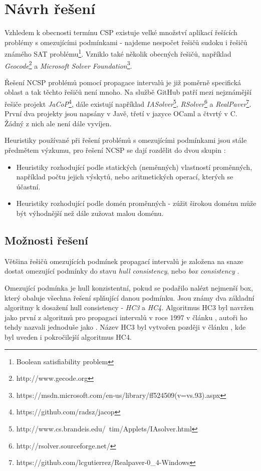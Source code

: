 \chapter{Návrh řešení}

Vzhledem k obecnosti termínu CSP existuje velké množství aplikací řešících problémy s omezujícími podmínkami - najdeme nespočet řešičů sudoku i řešičů známého SAT problému\footnote{Boolean satisfiability problem}. Vzniklo také několik obecných řešičů, například \emph{Geocode}\footnote{http://www.gecode.org} a \emph{Microsoft Solver Foundation}\footnote{https://msdn.microsoft.com/en-us/library/ff524509(v=vs.93).aspx}.

Řešení NCSP problémů pomocí propagace intervalů je již poměrně specifická oblast a tak těchto řešičů není mnoho. Na službě GitHub patří mezi nejznámější řešiče projekt \emph{JaCoP}\footnote{https://github.com/radsz/jacop}, dále existují například \emph{IASolver}\footnote{http://www.cs.brandeis.edu/~tim/Applets/IAsolver.html}, \emph{RSolver}\footnote{http://rsolver.sourceforge.net/} a \emph{RealPaver}\footnote{https://github.com/lcgutierrez/Realpaver-0\_4-Windows}. První dva projekty jsou napsány v Javě, třetí v jazyce OCaml a čtvrtý v C. Žádný z nich ale není dále vyvíjen.

Heuristiky používané při řešení problémů s omezujícími podmínkami jsou stále předmětem výzkumu, pro řešení NCSP se dají rozdělit do dvou skupin \cite{feiten10}:

\begin{itemize}
  \item Heuristiky rozhodující podle statických (neměnných) vlastností proměnných, například počtu jejich výskytů, nebo aritmetických operací, kterých se účastní.
  \item Heuristiky rozhodující podle domén proměnných - zúžit širokou doménu může být výhodnější než dále zužovat malou doménu.
\end{itemize}

\section{Možnosti řešení}
Většina řešičů omezujících podmínek propagací intervalů je založena na snaze dostat omezující podmínky do stavu \emph{hull consistency}, nebo \emph{box consistency} \cite{Benhamou99revisinghull}.

Omezující podmínka je hull konzistentní, pokud se podařilo nalézt nejmenší box, který obaluje všechna řešení splňující danou podmínku. Jsou známy dva základní algoritmy k dosažení hull consistency - \emph{HC3} a \emph{HC4}. Algoritmus HC3 byl navržen jako první z algoritmů pro propagaci intervalů v roce 1997 v článku \cite{Benhamou97applyinginterval}, autoři ho tehdy nazvali jednoduše jako . Název HC3 byl vytvořen později v článku \cite{Benhamou99revisinghull}, kde byl uveden i pokročilejší algoritmus HC4.

